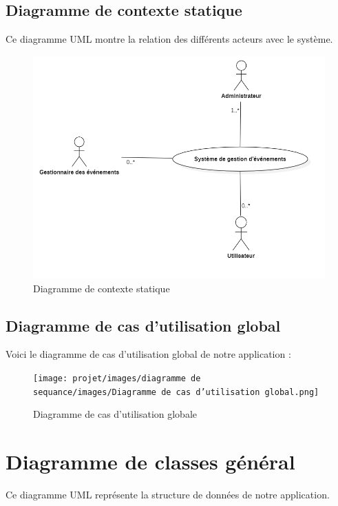 
\subsection{Diagramme de contexte statique}
Ce diagramme UML montre la relation des différents acteurs avec le système.

\begin{figure}[H]
    \centering
    \includegraphics[scale=0.3]{projet/images/diagramme de sequance/images/Diagramme de contexte statique.png}
    \caption{Diagramme de contexte statique}
\end{figure}

\subsection{Diagramme de cas d’utilisation global}
Voici le diagramme de cas d’utilisation global de notre application :

\begin{figure}[H]
    \centering
    \texttt{[image: projet/images/diagramme de sequance/images/Diagramme de cas d’utilisation global.png]}
    \caption{Diagramme de cas d'utilisation globale}
\end{figure}

\section{Diagramme de classes général}

Ce diagramme UML représente la structure de données de notre application.

